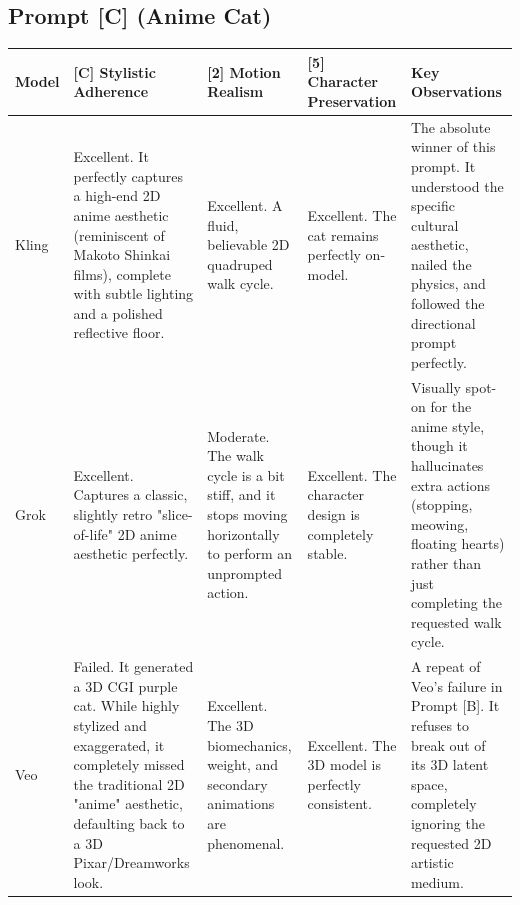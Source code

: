 \documentclass[sigconf]{acmart}
\begin{document}
\subsection*{Prompt [C] (Anime Cat)}
\begin{table}[t]
    \centering
    \renewcommand{\arraystretch}{1.3}
    \begin{tabularx}{\textwidth}{| l | >{\raggedright\arraybackslash}X | >{\raggedright\arraybackslash}X | >{\raggedright\arraybackslash}X | >{\raggedright\arraybackslash}X |}
        \hline
        \textbf{Model} & \textbf{[C] Stylistic Adherence}                                                                                                                                                           & \textbf{[2] Motion Realism}                                                                                & \textbf{[5] Character Preservation}                                 & \textbf{Key Observations}                                                                                                                                             \\ \hline
        Kling          & Excellent. It perfectly captures a high-end 2D anime aesthetic (reminiscent of Makoto Shinkai films), complete with subtle lighting and a polished reflective floor.                       & Excellent. A fluid, believable 2D quadruped walk cycle.                                                    & Excellent. The cat remains perfectly on-model.                      & The absolute winner of this prompt. It understood the specific cultural aesthetic, nailed the physics, and followed the directional prompt perfectly.                 \\ \hline
        Grok           & Excellent. Captures a classic, slightly retro "slice-of-life" 2D anime aesthetic perfectly.                                                                                                & Moderate. The walk cycle is a bit stiff, and it stops moving horizontally to perform an unprompted action. & Excellent. The character design is completely stable.               & Visually spot-on for the anime style, though it hallucinates extra actions (stopping, meowing, floating hearts) rather than just completing the requested walk cycle. \\ \hline
        Veo            & Failed. It generated a 3D CGI purple cat. While highly stylized and exaggerated, it completely missed the traditional 2D "anime" aesthetic, defaulting back to a 3D Pixar/Dreamworks look. & Excellent. The 3D biomechanics, weight, and secondary animations are phenomenal.                           & Excellent. The 3D model is perfectly consistent.                    & A repeat of Veo's failure in Prompt [B]. It refuses to break out of its 3D latent space, completely ignoring the requested 2D artistic medium.                        \\ \hline

\end{tabularx}
\end{table}
\end{document}
